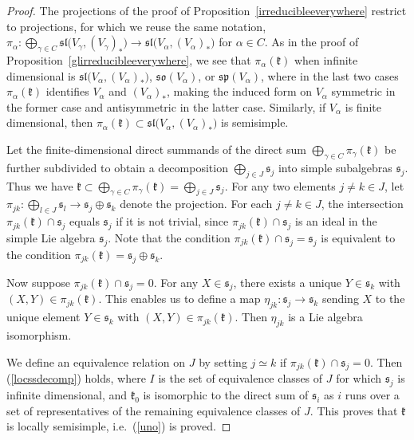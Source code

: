 \documentclass{article}
\def\sl{\mathfrak{sl}}
\def\so{\mathfrak{so}}
\def\sp{\mathfrak{sp}}
\def\k{\mathfrak{k}}
\def\s{\mathfrak{s}}
\begin{document}
\begin{proof}
The projections of the proof of Proposition~\ref{irreducibleeverywhere} restrict to projections, for which we reuse the same notation, $\pi_\alpha \colon  \bigoplus_{\gamma \in C} \sl \big( V_\gamma , (V_\gamma)_* \big) \rightarrow  \sl \big(V_\alpha , (V_\alpha)_* \big)$ for $\alpha \in C$.  As in the proof of Proposition~\ref{glirreducibleeverywhere}, we see
that $\pi_\alpha (\k)$ when infinite dimensional is $\sl \big( V_\alpha,(V_\alpha)_* \big)$, $\so(V_\alpha)$, or $\sp(V_\alpha)$, where in the last two cases $\pi_\alpha (\k)$ identifies $V_\alpha$ and $(V_\alpha)_*$, making the induced form on $V_\alpha$ symmetric in the former case and antisymmetric in the latter case.
Similarly, if $V_\alpha$ is finite dimensional, then $\pi_\alpha (\k) \subset \sl \big( V_\alpha , (V_\alpha)_* \big)$ is semisimple.  

Let the finite-dimensional direct summands of the direct sum $\bigoplus_{\gamma \in C} \pi_\gamma (\k)$ be further subdivided to obtain a decomposition $\bigoplus_{j \in J} \s_j$ into simple subalgebras $\s_j$.  Thus we have $\k \subset \bigoplus_{\gamma \in C} \pi_\gamma (\k) = \bigoplus_{j \in J} \s_j$.  For any two elements $j \neq k \in J$, let $\pi_{jk} \colon \bigoplus_{l \in J} \s_l \rightarrow \s_j \oplus \s_k$ denote the projection.
For each $j \neq k \in J$, the intersection $\pi_{jk} (\k) \cap \s_j$ equals $\s_j$ if it is not trivial, since
$\pi_{jk} (\k) \cap \s_j$ is an ideal in the simple Lie algebra $\s_j$.  Note that the condition $\pi_{jk} (\k) \cap \s_j = \s_j$ is equivalent to the condition $\pi_{jk} (\k) = \s_j \oplus \s_k$.  

Now suppose $\pi_{jk} (\k) \cap \s_j = 0$.  For any $X \in \s_j$, there exists a unique $Y \in \s_k$ with $(X,Y) \in \pi_{jk} (\k)$.  This enables us to define a map $\eta_{jk} \colon  \s_j \rightarrow  \s_k$ sending $X$ to the unique element $Y \in \s_k$ with $(X,Y) \in \pi_{jk} (\k)$.  Then $\eta_{jk}$ is a Lie algebra isomorphism.

We define an equivalence relation on $J$ by setting $j \simeq k$ if $\pi_{jk} (\k) \cap \s_j = 0$.  Then (\ref{locssdecomp}) holds, where $I$ is the set of equivalence classes of $J$ for which $\s_j$ is infinite dimensional, and $\k_0$ is isomorphic to the direct sum of $\s_i$ as $i$ runs over a set of representatives of the remaining equivalence classes of $J$. 
This proves that $\k$ is locally semisimple, i.e.\ (\ref{uno}) is proved.  
 

\end{proof}
\end{document}
